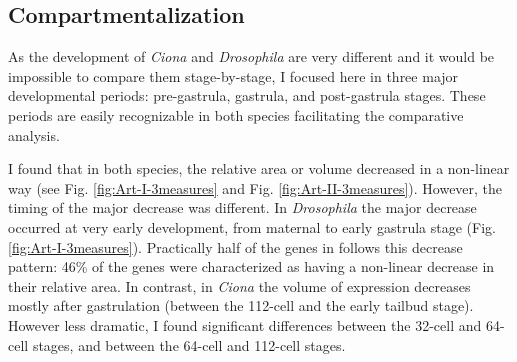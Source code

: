 \subsection{Compartmentalization}
%

As the development of \textit{Ciona} and \textit{Drosophila} are very different and it would be impossible to compare them stage-by-stage, I focused here in three major developmental periods: pre-gastrula, gastrula, and post-gastrula stages. These periods are easily recognizable in both species facilitating the comparative analysis.

I found that in both species, the relative area or volume decreased in a non-linear way (see Fig. \ref{fig:Art-I-3measures} and Fig. \ref{fig:Art-II-3measures}). 
However, the timing of the major decrease was different.
In \textit{Drosophila} the major decrease occurred at very early development, from maternal to early gastrula stage (Fig. \ref{fig:Art-I-3measures}).
Practically half of the genes in follows this decrease pattern: 46\% of the genes were characterized as having a non-linear decrease in their relative area.
In contrast, in \textit{Ciona} the volume of expression decreases mostly after gastrulation (between the 112-cell and the early tailbud stage).
However less dramatic, I found significant differences between the 32-cell and 64-cell stages, and between the 64-cell and 112-cell stages.

